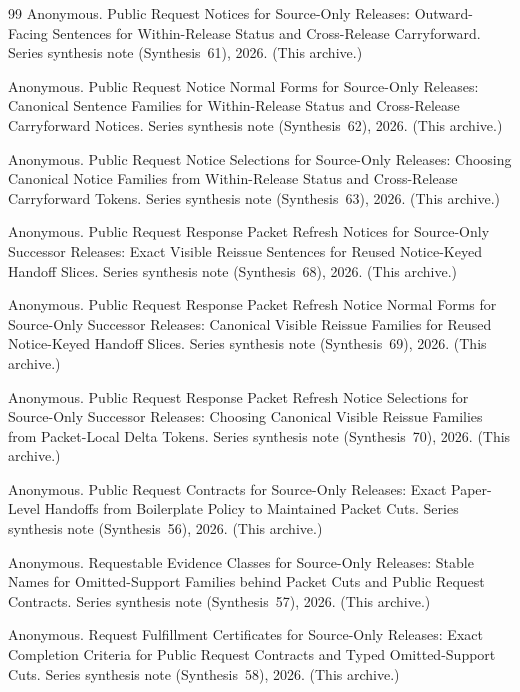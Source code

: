 \documentclass[11pt]{article}
\begin{document}
\begin{thebibliography}{99}
Anonymous.
\newblock Public Request Notices for Source-Only Releases: Outward-Facing Sentences for Within-Release Status and Cross-Release Carryforward.
\newblock Series synthesis note (Synthesis~61), 2026. (This archive.)

Anonymous.
\newblock Public Request Notice Normal Forms for Source-Only Releases: Canonical Sentence Families for Within-Release Status and Cross-Release Carryforward Notices.
\newblock Series synthesis note (Synthesis~62), 2026. (This archive.)

Anonymous.
\newblock Public Request Notice Selections for Source-Only Releases: Choosing Canonical Notice Families from Within-Release Status and Cross-Release Carryforward Tokens.
\newblock Series synthesis note (Synthesis~63), 2026. (This archive.)

Anonymous.
\newblock Public Request Response Packet Refresh Notices for Source-Only Successor Releases: Exact Visible Reissue Sentences for Reused Notice-Keyed Handoff Slices.
\newblock Series synthesis note (Synthesis~68), 2026. (This archive.)

Anonymous.
\newblock Public Request Response Packet Refresh Notice Normal Forms for Source-Only Successor Releases: Canonical Visible Reissue Families for Reused Notice-Keyed Handoff Slices.
\newblock Series synthesis note (Synthesis~69), 2026. (This archive.)

Anonymous.
\newblock Public Request Response Packet Refresh Notice Selections for Source-Only Successor Releases: Choosing Canonical Visible Reissue Families from Packet-Local Delta Tokens.
\newblock Series synthesis note (Synthesis~70), 2026. (This archive.)

Anonymous.
\newblock Public Request Contracts for Source-Only Releases: Exact Paper-Level Handoffs from Boilerplate Policy to Maintained Packet Cuts.
\newblock Series synthesis note (Synthesis~56), 2026. (This archive.)

Anonymous.
\newblock Requestable Evidence Classes for Source-Only Releases: Stable Names for Omitted-Support Families behind Packet Cuts and Public Request Contracts.
\newblock Series synthesis note (Synthesis~57), 2026. (This archive.)

Anonymous.
\newblock Request Fulfillment Certificates for Source-Only Releases: Exact Completion Criteria for Public Request Contracts and Typed Omitted-Support Cuts.
\newblock Series synthesis note (Synthesis~58), 2026. (This archive.)

\end{thebibliography}
\end{document}
